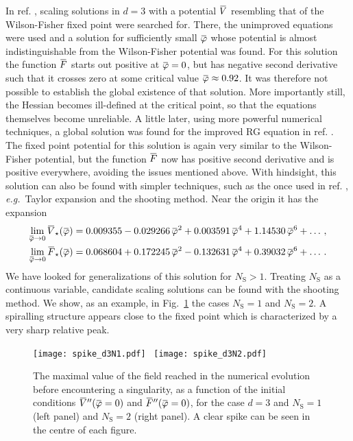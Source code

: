 \documentclass[11pt]{book} %
\newcommand{\overbar}[1]{\mkern 1.5mu\overline{\mkern-1.5mu#1\mkern-1.5mu}\mkern 1.5mu}
\newcommand\NS{ N_{\scriptscriptstyle{\mathrm{S}}} }
\newcommand{\bV}{\overbar V}
\newcommand{\bF}{\overbar F}
\newcommand{\bVstar}{\bV_\star}
\newcommand{\bFstar}{\bF_\star}
\newcommand{\bp}{\overbar \varphi}
\newcommand\eg{\textit{e.g.}\ }
\numberwithin{equation}{chapter}
\begin{document}
In ref. \cite{Percacci:2015wwa}, scaling solutions in $d=3$
with a potential $\bV$ resembling that of the Wilson-Fisher fixed point
were searched for.
There, the unimproved equations were used
and a solution for sufficiently small $\bp$
whose potential is almost indistinguishable from the
Wilson-Fisher potential was found. For this solution the function $\bF$
starts out positive at $\bp = 0$, but has negative
second derivative such that it crosses zero at
some critical value $\bp \approx 0.92$.
It was therefore not possible to establish the global existence of that solution.
More importantly still, the Hessian becomes ill-defined at the
critical point, so that the equations themselves become unreliable.
A little later, using more powerful numerical techniques,
a global solution was found for the improved RG equation in ref. \cite{Borchardt:2015rxa}.
The fixed point potential for this solution is again
very similar to the Wilson-Fisher potential,
but the function $\bF$ now has positive second derivative
and is positive everywhere, avoiding the issues mentioned above.
With hindsight, this solution can also be found with
simpler techniques, such as the once used in ref. \cite{Percacci:2015wwa},
\eg Taylor expansion and the shooting method.
Near the origin it has the expansion
\begin{align}
  \lim_{\bp \rightarrow 0} \bVstar(\bp) &= 0.009355 - 0.029266 \, \bp ^2 + 0.003591 \, \bp ^4 + 1.14530 \, \bp ^6 + \dots \,, \\
  \lim_{\bp \rightarrow 0} \bFstar(\bp) &= 0.068604 + 0.172245 \, \bp ^2 - 0.132631 \, \bp ^4 + 0.39032 \, \bp ^6 + \dots \,.
\end{align}
We have looked for generalizations of this solution for $\NS>1$.
Treating $\NS$ as a continuous variable, candidate scaling solutions
can be found with the shooting method.
We show, as an example, in Fig.~\ref{WFN1N2} the cases $\NS=1$ and $\NS=2$.
A spiralling structure appears close to the fixed point which is characterized by a very sharp relative peak.
\begin{figure}
  \texttt{[image: spike\_d3N1.pdf]}
  \
  \texttt{[image: spike\_d3N2.pdf]}
  \caption{
    The maximal value of the field reached in the numerical
    evolution before encountering a singularity, as a function
    of the initial conditions $\bV''(\bp=0)$ and $\bF''(\bp=0)$,
    for the case $d=3$ and $\NS=1$ (left panel) and $\NS=2$ (right panel).
    A clear spike can be seen in the centre of each figure.
  }
  \label{WFN1N2}
\end{figure}
\end{document}
